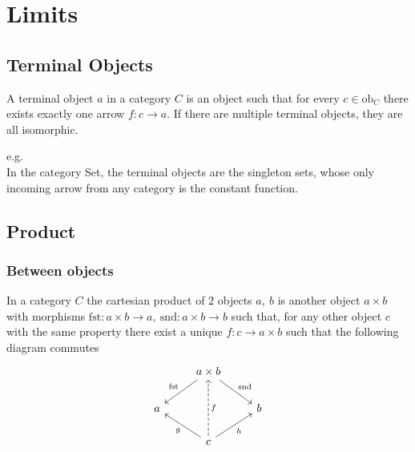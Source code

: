 \section{Limits}

\subsection{Terminal Objects}
A terminal object $a$ in a category $C$ is an object such that for every
$c\in \mathrm{ob}_C$ there exists exactly one arrow $f: c\to a$. If there are
multiple terminal objects, they are all isomorphic.

e.g.\\
In the category Set, the terminal objects are the singleton sets, whose only
incoming arrow from any category is the constant function.

\subsection{Product}
\subsubsection*{Between objects}
\cite{nlab:cartesian_product}
In a category $C$ the cartesian product of $2$ objects $a,\ b$ is another
object $a\times b$ with morphisms $\mathrm{fst}: a\times b \to a,
\ \mathrm{snd}: a\times b \to b$ such that, for any other object $c$ with the
same property there exist a unique $f:c \to a\times b$ such that the following
diagram commutes
\[\begin{tikzcd}
	& {a\times b} \\
	a && b \\
	& c
	\arrow["{\mathrm{fst}}"', from=1-2, to=2-1]
	\arrow["{\mathrm{snd}}", from=1-2, to=2-3]
	\arrow["f"', dashed, from=3-2, to=1-2]
	\arrow["g", from=3-2, to=2-1]
	\arrow["h"', from=3-2, to=2-3]
\end{tikzcd}\]

